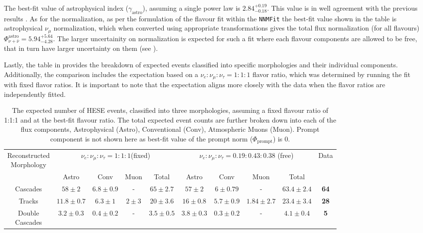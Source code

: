 The best-fit value of astrophysical index ($\gamma_{\mathrm{astro}}$), assuming a single power law is $2.84_{-0.18}^{+0.19}$. This value is in well agreement with the previous results . As for the normalization, as per the formulation of the flavour fit within the \texttt{NNMFit} the best-fit value shown in the table is astrophysical $\nu_{\mu}$ normalization, which when converted using appropriate transformations gives the total flux normalization (for all flavours) $\Phi_{\nu+\bar\nu}^{\mathrm{astro}} = 5.94_{-4.28}^{+5.64}$. The larger uncertainity on normalization is expected for such a fit where each flavour components are allowed to be free, that in turn have larger uncertainty on them (see ). 

Lastly, the table in  provides the breakdown of expected events classified into specific morphologies and their individual components. Additionally, the comparison includes the expectation based on a $\nu_e:\nu_{\mu}:\nu_{\tau} = 1:1:1$ flavor ratio, which was determined by running the fit with fixed flavor ratios. It is important to note that the expectation aligns more closely with the data when the flavor ratios are independently fitted.

\begin{table}[h]
    \caption{The expected number of HESE events, classified into three morphologies, assuming a fixed flavour ratio of 1:1:1 and at the best-fit flavour ratio. The total expected event counts are further broken down into each of the flux components, Astrophysical (Astro), Conventional (Conv), Atmospheric Muons (Muon). Prompt component is not shown here as best-fit value of the prompt norm ($\Phi_{\mathrm{prompt}}$) is 0.}
    
    \begin{tabular}{ c| c c c c |c c c c|c}
        
        \hline
        \makecell{Reconstructed \\ Morphology} & \multicolumn{4}{c|}{$\nu_e:\nu_{\mu}:\nu_{\tau} = 1:1:1$(fixed)}  & \multicolumn{4}{c|}{$\nu_e:\nu_{\mu}:\nu_{\tau} = 0.19:0.43:0.38$ (free)} & Data\\
         &Astro&Conv&Muon&Total&Astro&Conv&Muon&Total& \\
        \hline
        \hline
        Cascades&$58\pm2$&$6.8\pm0.9$&-&\textbf{$65\pm2.7$}&$57\pm2$&$6\pm0.79$&-&\textbf{$63.4\pm2.4$}&\textbf{64}\\
        Tracks&$11.8\pm0.7$&$6.3\pm1$&$2\pm3$&\textbf{$20\pm3.6$}&$16\pm0.8$&$5.7\pm0.9$&$1.84\pm2.7$&\textbf{$23.4\pm3.4$}&\textbf{28}\\
        \makecell{Double \\ Cascades}&$3.2\pm0.3$&$0.4\pm0.2$&-&\textbf{$3.5\pm0.5$}&$3.8\pm0.3$&$0.3\pm0.2$&-&\textbf{$4.1\pm0.4$}&\textbf{5}\\
        \hline
        \hline
    \end{tabular}
    
\end{table}

